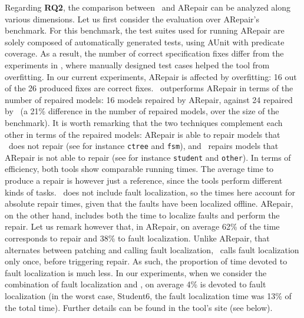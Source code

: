 Regarding \textbf{RQ2}, the comparison between \technique\ and ARepair can be analyzed along various dimensions. Let us first consider the evaluation over ARepair's benchmark. For this benchmark, the test suites used for running ARepair are solely composed of automatically generated tests, using AUnit with predicate coverage. As a result, the number of correct specification fixes differ from the experiments in \cite{Wang+2018}, where manually designed test cases helped the tool from overfitting. In our current experiments, ARepair is affected by overfitting: 16 out of the 26 produced fixes are correct fixes. \technique\ outperforms ARepair in terms of the number of repaired models: 16 models repaired by ARepair, against 24 repaired by \technique\ (a 21\% difference in the number of repaired models, over the size of the benchmark). It is worth remarking that the two techniques complement each other in terms of the repaired models: ARepair is able to repair models that \technique\ does not repair (see for instance \texttt{ctree} and \texttt{fsm}), and \technique\ repairs models that ARepair is not able to repair (see for instance \texttt{student} and \texttt{other}). In terms of efficiency, both tools show comparable running times. The average time to produce a repair is however just a reference, since the tools perform different kinds of tasks. \technique\ does not include fault localization, so the times here account for absolute repair times, given that the faults have been localized offline. ARepair, on the other hand, includes both the time to localize faults and perform the repair. Let us remark however that, in ARepair, on average 62\% of the time corresponds to repair and 38\% to fault localization. Unlike ARepair, that alternates between patching and calling fault localization, \technique\ calls fault localization only once, before triggering repair. As such, the proportion of time devoted to fault localization is much less. In our experiments, when we consider the combination of fault localization and {\technique}, on average 4\% is devoted to fault localization (in the worst case, Student6, the fault localization time was 13\% of the total time). Further details can be found in the tool's site (see below).  


